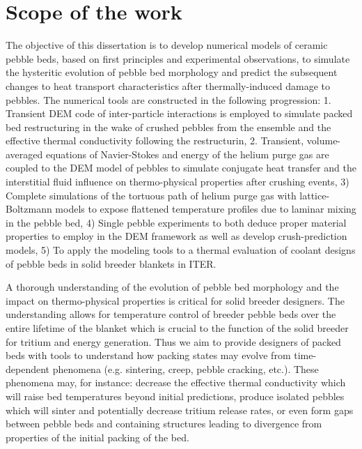 \section{Scope of the work}\label{sec:intro-scope-of-work}
The objective of this dissertation is to develop numerical models of ceramic pebble beds, based on first principles and experimental observations, to simulate the hysteritic evolution of pebble bed morphology and predict the subsequent changes to heat transport characteristics after thermally-induced damage to pebbles. The numerical tools are constructed in the following progression: 1. Transient DEM code of inter-particle interactions is employed to simulate packed bed restructuring in the wake of crushed pebbles from the ensemble and the effective thermal conductivity following the restructurin, 2. Transient, volume-averaged equations of Navier-Stokes and energy of the helium purge gas are coupled to the DEM model of pebbles to simulate conjugate heat transfer and the interstitial fluid influence on thermo-physical properties after crushing events, 3) Complete simulations of the tortuous path of helium purge gas with lattice-Boltzmann models to expose flattened temperature profiles due to laminar mixing in the pebble bed, 4) Single pebble experiments to both deduce proper material properties to employ in the DEM framework as well as develop crush-prediction models, 5) To apply the modeling tools to a thermal evaluation of coolant designs of pebble beds in solid breeder blankets in ITER. 

A thorough understanding of the evolution of pebble bed morphology and the impact on thermo-physical properties is critical for solid breeder designers. The understanding allows for temperature control of breeder pebble beds over the entire lifetime of the blanket which is crucial to the function of the solid breeder for tritium and energy generation. Thus we aim to provide designers of packed beds with tools to understand how packing states may evolve from time-dependent phenomena (e.g. sintering, creep, pebble cracking, etc.). These phenomena may, for instance: decrease the effective thermal conductivity which will raise bed temperatures beyond initial predictions, produce isolated pebbles which will sinter and potentially decrease tritium release rates, or even form gaps between pebble beds and containing structures leading to divergence from properties of the initial packing of the bed.

